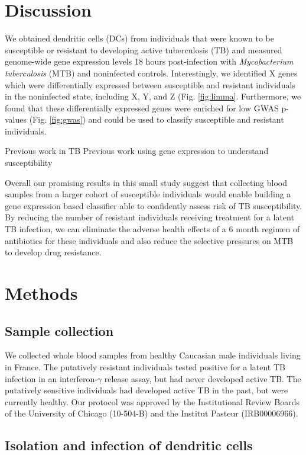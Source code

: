 \documentclass[fleqn,10pt]{wlscirep}
\begin{document}
\section*{Discussion}

We obtained dendritic cells (DCs) from individuals that were known to be susceptible or resistant to developing active tuberculosis (TB) and measured genome-wide gene expression levels 18 hours post-infection with \emph{Mycobacterium tuberculosis} (MTB) and noninfected controls. Interestingly, we identified X genes which were differentially expressed between susceptible and resistant individuals in the noninfected state, including X, Y, and Z (Fig. \ref{fig:limma}. Furthermore, we found that these differentially expressed genes were enriched for low GWAS p-values (Fig. \ref{fig:gwas}) and could be used to classify susceptible and resistant individuals. 

Previous work in TB \cite{Thuong2008}
Previous work using gene expression to understand susceptibility \cite{Bryant2014}

Overall our promising results in this small study suggest that collecting blood samples from a larger cohort of susceptible individuals would enable building a gene expression based classifier able to confidently assess risk of TB susceptibility. By reducing the number of resistant individuals receiving treatment for a latent TB infection, we can eliminate the adverse health effects of a 6 month regimen of antibiotics for these individuals and also reduce the selective pressures on MTB to develop drug resistance.
\section*{Methods}

\subsection*{Sample collection}

We collected whole blood samples from healthy Caucasian male individuals living in France. The putatively resistant individuals tested positive for a latent TB infection in an interferon-$\gamma$ release assay, but had never developed active TB. The putatively sensitive individuals had developed active TB in the past, but were currently healthy. Our protocol was approved by the Institutional Review Boards of the University of Chicago (10-504-B) and the Institut Pasteur (IRB00006966).
\subsection*{Isolation and infection of dendritic cells}
\end{document}
